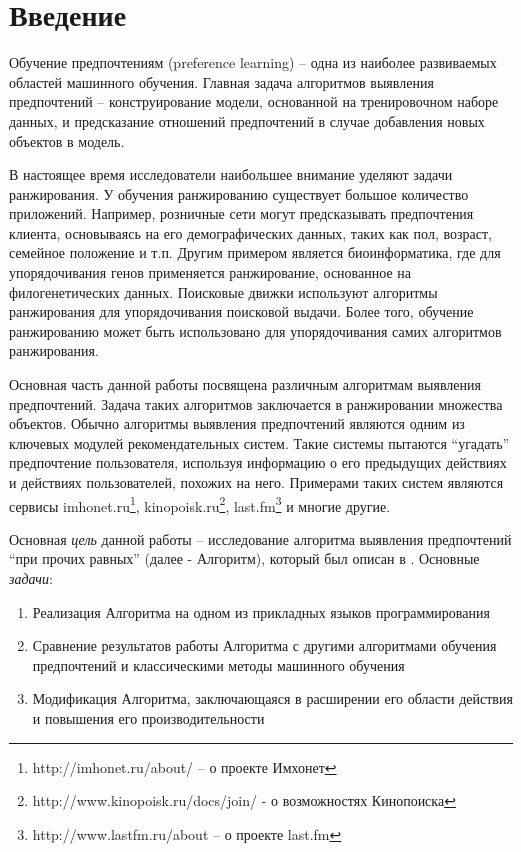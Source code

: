 \chapter*{Введение}

Обучение предпочтениям (preference learning) – одна из наиболее развиваемых областей машинного обучения. Главная задача алгоритмов выявления предпочтений – конструирование модели, основанной на тренировочном наборе данных, и предсказание отношений предпочтений в случае добавления новых объектов в модель.

В настоящее время исследователи наибольшее внимание уделяют задачи ранжирования. У обучения ранжированию существует большое количество приложений. Например, розничные сети могут предсказывать предпочтения клиента, основываясь на его демографических данных, таких как пол, возраст, семейное положение и т.п. Другим примером является биоинформатика, где для упорядочивания генов применяется ранжирование, основанное на филогенетических данных. \cite{Balasubramaniyan:2005} Поисковые движки используют алгоритмы ранжирования для упорядочивания поисковой выдачи. Более того, обучение ранжированию может быть использовано для упорядочивания самих алгоритмов ранжирования\cite{Brazdil:2003}.

Основная часть данной работы посвящена различным алгоритмам выявления предпочтений. Задача таких алгоритмов заключается в ранжировании множества объектов. Обычно алгоритмы выявления предпочтений являются одним из ключевых модулей рекомендательных систем. Такие системы пытаются \enquote{угадать} предпочтение пользователя, используя информацию о его предыдущих действиях и действиях пользователей, похожих на него. Примерами таких систем являются сервисы imhonet.ru\footnote{http://imhonet.ru/about/ – о проекте Имхонет}, kinopoisk.ru\footnote{http://www.kinopoisk.ru/docs/join/ - о возможностях Кинопоиска}, last.fm\footnote{http://www.lastfm.ru/about – о проекте last.fm} и многие другие.

Основная \emph{цель} данной работы – исследование алгоритма выявления предпочтений \enquote{при прочих равных} (далее - Алгоритм), который был описан в \cite{Obiedkov:2013}. Основные \emph{задачи}:
\begin{enumerate}[itemsep=-1mm]
	\item Реализация Алгоритма на одном из прикладных языков программирования
	\item Сравнение результатов работы Алгоритма с другими алгоритмами обучения предпочтений и классическими методы машинного обучения
	\item Модификация Алгоритма, заключающаяся в расширении его области действия и повышения его производительности
\end{enumerate}

